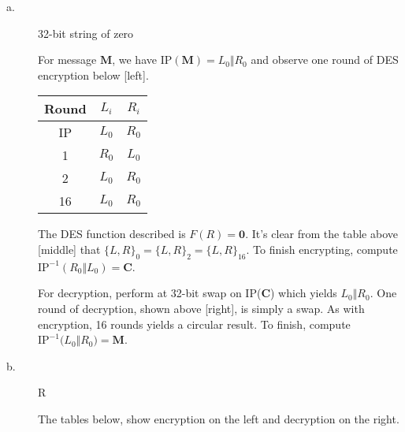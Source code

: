 \documentclass[../hw_sols.tex]{subfiles}
\begin{document}
\begin{description}

\item[a.] 32-bit string of zero

\begin{solution}

For message $\mathbf{M}$, we have IP$(\mathbf{M}) = L_0 \Vert R_0$ and observe 
one round of DES encryption below [left].

\begin{multicols}{3}
	\hfill   %
	

	\begin{center}
	\begin{tabular}{ c | c | c }
		\textbf{Round} & $L_i$ & $R_i$ \\[2pt]   %
		\hline
		IP & $L_0$ & $R_0$ \\[5pt]
		 1 & $R_0$ & $L_0$ \\[5pt]
		 2 & $L_0$ & $R_0$ \\[5pt]
		16 & $L_0$ & $R_0$ \\[5pt]
	\end{tabular}
	\end{center}

	
\end{multicols}

\vspace{-0.25cm}
The DES function described is $F(R) = \mathbf{0}$. It's clear from the table 
above [middle] that $\{L,R\}_0 = \{L,R\}_2 = \{L,R\}_{16}$. To finish 
encrypting, compute $\text{IP}^{-1}(R_0 \Vert L_0) = \mathbf{C}$.

For decryption, perform at 32-bit swap on IP($\mathbf{C}$) which yields 
$L_0 \Vert R_0$. One round of decryption, shown above [right], is simply a 
swap. As with encryption, 16 rounds yields a circular result. To finish, 
compute $\text{IP}^{-1}\big( L_0 \Vert R_0 \big) = \textbf{M}$.

\end{solution}


\item[b.] R

\begin{solution}

The tables below, show encryption on the left and decryption on the right.


\end{solution}
\end{description}
\end{document}
